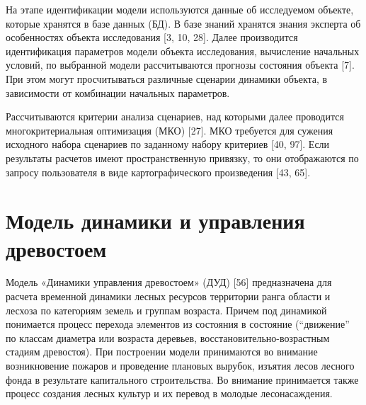 На этапе идентификации модели используются данные об исследуемом объекте, которые хранятся в базе данных (БД). В базе знаний хранятся знания эксперта об особенностях объекта исследования [3, 10, 28]. Далее  производится идентификация параметров модели объекта исследования, вычисление начальных условий, по выбранной модели рассчитываются прогнозы состояния объекта [7]. При этом могут просчитываться различные сценарии динамики объекта, в зависимости от комбинации начальных параметров.

Рассчитываются критерии анализа сценариев, над которыми далее проводится многокритериальная оптимизация (МКО) [27]. МКО требуется для сужения исходного набора сценариев по заданному набору критериев [40, 97]. Если результаты расчетов имеют пространственную привязку, то они отображаются по запросу пользователя в виде картографического произведения [43, 65].



\section{Модель динамики и управления древостоем}

Модель «Динамики управления древостоем» (ДУД) [56]  предназначена для расчета временной динамики лесных ресурсов территории ранга области и лесхоза по категориям земель и группам возраста. Причем под динамикой понимается процесс перехода элементов из состояния в состояние (“движение” по классам диаметра или возраста деревьев, восстановительно-возрастным стадиям древостоя). При построении модели принимаются во внимание возникновение пожаров и проведение плановых вырубок, изъятия лесов лесного фонда в результате капитального строительства. Во внимание принимается также процесс создания лесных культур и их перевод в молодые лесонасаждения.

